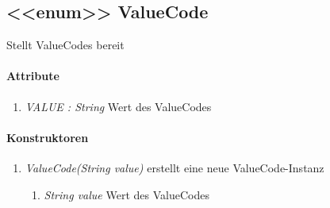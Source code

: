 \subsection*{<{<{enum}>}> ValueCode}\label{valCode}
Stellt ValueCodes bereit

\paragraph{Attribute}
\begin{enumerate}[$\bullet$]
	\item \textit{VALUE : String} Wert des ValueCodes
\end{enumerate}

\paragraph{Konstruktoren}
\begin{enumerate}[+]
	\item \textit{ ValueCode(String value)}
	erstellt eine neue ValueCode-Instanz
	\begin{enumerate}[$\bullet$]
		\item \textit{String value} Wert des ValueCodes

	\end{enumerate}
	
\end{enumerate}
